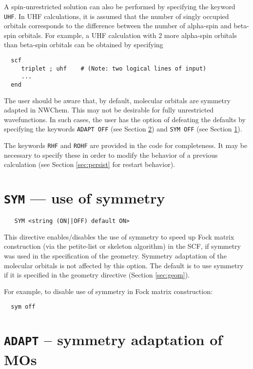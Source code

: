 A spin-unrestricted solution can also be performed by specifying the
keyword \verb+UHF+.  In UHF calculations, it is assumed that the
number of singly occupied orbitals corresponds to the difference
between the number of alpha-spin and beta-spin orbitals.  For example,
a UHF calculation with 2 more alpha-spin orbitals than beta-spin
orbitals can be obtained by specifying

\begin{verbatim}
  scf
     triplet ; uhf    # (Note: two logical lines of input)
     ...
  end
\end{verbatim}

The user should be aware that, by default, molecular orbitals are
symmetry adapted in NWChem.  This may not be desirable for fully
unrestricted wavefunctions.  In such cases, the user has the option of
defeating the defaults by specifying the keywords \verb+ADAPT OFF+
(see Section \ref{sec:adapt}) and \verb+SYM OFF+ (see Section
\ref{sec:sym}).

The keywords \verb+RHF+ and \verb+ROHF+ are provided in the code for
completeness. It may be necessary to specify these in order to modify
the behavior of a previous calculation (see Section \ref{sec:persist}
for restart behavior).

\section{{\tt SYM} --- use of symmetry}
\label{sec:sym}

 \begin{verbatim}
   SYM <string (ON||OFF) default ON>
 \end{verbatim}

This directive enables/disables the use of symmetry to speed up Fock matrix
construction (via the petite-list or skeleton algorithm) in the SCF, if
symmetry was used in the specification of the geometry.  Symmetry
adaptation of the molecular orbitals is not affected by this option.
The default is to use symmetry if it is specified in the geometry
directive (Section \ref{sec:geom}). 

For example, to disable use of symmetry in Fock matrix construction:
\begin{verbatim}
  sym off
\end{verbatim}

\section{{\tt ADAPT} -- symmetry adaptation of MOs}
\label{sec:adapt}

